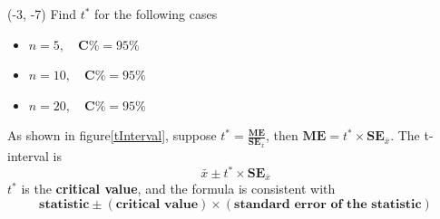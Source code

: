 \documentclass[a4paper, 12pt,twoside]{book}
\begin{document}
    \begin{textblock}{4.8}(-3, -7)
    Find $t^*$ for the following cases
    \begin{itemize}[leftmargin = 0.3cm]
      \item $n=5, \quad \textbf{C\%} = 95\%$
      \item $n=10, \quad \textbf{C\%} = 95\%$
      \item $n=20, \quad \textbf{C\%} = 95\%$
    \end{itemize}
    \end{textblock}
    As shown in figure\ref{tInterval}, suppose $\displaystyle{t^* = \frac{\textbf{ME}}{\textbf{SE}_{\overline{x}}}}$, then $\textbf{ME} = t^*\times \textbf{SE}_{\bar{x}}$. The t-interval is 
    $$\bar{x}\pm t^*\times \textbf{SE}_{\bar{x}}$$
    $t^*$ is the \textbf{critical value}, and the formula is consistent with
    $$\textbf{statistic} \pm (\textbf{critical value})\times (\textbf{standard error of the statistic})$$
    
    \newpage
    
\end{document}
